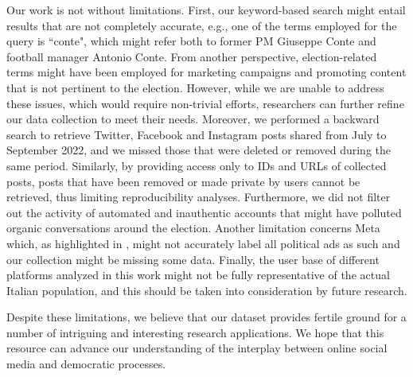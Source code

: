 \documentclass[sigconf,screen]{acmart}
\begin{document}
Our work is not without limitations. First, our keyword-based search might entail results that are not completely accurate, e.g., one of the terms employed for the query is ``conte", which might refer both to former PM Giuseppe Conte and football manager Antonio Conte. From another perspective, election-related terms might have been employed for marketing campaigns and promoting content that is not pertinent to the election. However, while we are unable to address these issues, which would require non-trivial efforts, researchers can further refine our data collection to meet their needs. Moreover, we performed a backward search to retrieve Twitter, Facebook and Instagram posts shared from July to September 2022, and we missed those that were deleted or removed during the same period. Similarly, by providing access only to IDs and URLs of collected posts, posts that have been removed or made private by users cannot be retrieved, thus limiting reproducibility analyses. Furthermore, we did not filter out the activity of automated and inauthentic accounts that might have polluted organic conversations around the election. Another limitation concerns Meta which, as highlighted in \cite{le2022audit}, might not accurately label all political ads as such and our collection might be missing some data. Finally, the user base of different platforms analyzed in this work might not be fully representative of the actual Italian population, and this should be taken into consideration by future research.

Despite these limitations, we believe that our dataset provides fertile ground for a number of intriguing and interesting research applications. We hope that this resource can advance our understanding of the interplay between online social media and democratic processes.
\end{document}
